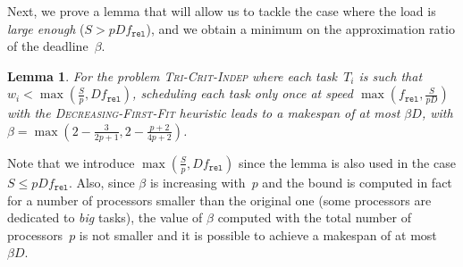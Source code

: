 \documentclass[a4paper]{article}
\theoremstyle{plain}
\newtheorem{lemma}{Lemma}
\theoremstyle{definition}
\theoremstyle{remark}
\newcommand{\fr}{\ensuremath{f_{\texttt{rel}}}\xspace}
\newcommand{\dff}{\textsc{Dec\-reasing-First-Fit}\xspace}
\newcommand{\indep}{\textsc{Tri-Crit-In\-dep}\xspace}
\begin{document}
Next, we prove a lemma that will allow us to tackle the case where the
load is {\em large enough} ($S>pD\fr$), and we obtain a minimum on the
approximation ratio of the deadline~$\beta$. 

\begin{lemma}
\label{lemma.bigload}
For the problem \indep where each task~$T_i$ is such that
 $w_i<\max(\frac{S}{p},D\fr)$,  scheduling each task only once at speed $\max(\fr,\frac{S}{pD})$ with
 the \dff heuristic leads to a make\-span of at most $\beta D$, with
 $\beta \!=\! \max\left(\!2\!-\!\frac{3}{2p+1}, 2\!-\!\frac{p+2}{4p+2}\!\right)$.
\end{lemma}

Note that we introduce $\max(\frac{S}{p},D\fr)$ since the lemma is
also used in the case $S\leq pD\fr$. Also, since $\beta$ is
increasing with~$p$ and the bound is computed in fact for a number of
processors smaller than the original one (some processors are
dedicated to {\em big} tasks), the value of $\beta$ computed with the
total number of processors~$p$ is not smaller and it is possible to
achieve a makespan of at most~$\beta D$. 
\end{document}
